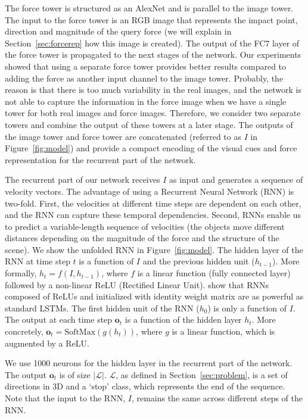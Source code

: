 \documentclass[runningheads]{llncs}
\begin{document}
The force tower is structured as an AlexNet \cite{alexnet} and is parallel to the image tower. The input to the force tower is an RGB image that represents the impact point, direction and magnitude of the query force (we will explain in Section~\ref{sec:forcerep} how this image is created). The output of the FC7 layer of the force tower is propagated to the next stages of the network. Our experiments showed that using a separate force tower provides better results compared to adding the force as another input channel to the image tower. Probably, the reason is that there is too much variability in the real images, and the network is not able to capture the information in the force image when we have a single tower for both real images and force images. Therefore, we consider two separate towers and combine the output of these towers at a later stage. The outputs of the image tower and force tower are concatenated (referred to as $I$ in Figure~\ref{fig:model}) and provide a compact encoding of the visual cues and force representation for the recurrent part of the network. 

The recurrent part of our network receives $I$ as input and generates a sequence of velocity vectors. The advantage of using a Recurrent Neural Network (RNN) is two-fold. First, the velocities at different time steps are dependent on each other, and the RNN can capture these temporal dependencies. Second, RNNs enable us to predict a variable-length sequence of velocities (the objects move different distances depending on the magnitude of the force and the structure of the scene). We show the unfolded RNN in Figure~\ref{fig:model}. The hidden layer of the RNN at time step $t$ is a function of $I$ and the previous hidden unit ($h_{t-1}$). More formally, $h_t = f(I,h_{t-1})$, where $f$ is a linear function (fully connected layer) followed by a non-linear ReLU (Rectified Linear Unit). \cite{le15} show that RNNs composed of ReLUs and initialized with identity weight matrix are as powerful as standard LSTMs. The first hidden unit of the RNN ($h_0$) is only a function of $I$. The output at each time step $\mathbf{o}_t$ is a function of the hidden layer $h_t$. More concretely, $\mathbf{o}_t = \mbox{SoftMax}(g(h_t))$, where $g$ is a linear function, which is augmented by a ReLU. 

We use 1000 neurons for the hidden layer in the recurrent part of the network. The output $\mathbf{o}_t$ is of size $|\mathcal{L}|$. $\mathcal{L}$, as defined in Section~\ref{sec:problem}, is a set of directions in 3D and a `stop' class, which represents the end of the sequence. Note that the input to the RNN, $I$, remains the same across different steps of the RNN. 
\end{document}
